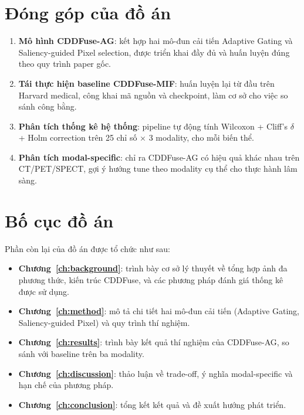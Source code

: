 \section{Đóng góp của đồ án}
\label{sec:contributions}

\begin{enumerate}\itemsep2pt
    \item \textbf{Mô hình CDDFuse-AG}: kết hợp hai mô-đun cải tiến Adaptive Gating và Saliency-guided Pixel selection, được triển khai đầy đủ và huấn luyện đúng theo quy trình paper gốc.
    \item \textbf{Tái thực hiện baseline CDDFuse-MIF}: huấn luyện lại từ đầu trên Harvard medical, công khai mã nguồn và checkpoint, làm cơ sở cho việc so sánh công bằng.
    \item \textbf{Phân tích thống kê hệ thống}: pipeline tự động tính Wilcoxon + Cliff's $\delta$ + Holm correction trên 25 chỉ số $\times$ 3 modality, cho mỗi biến thể.
    \item \textbf{Phân tích modal-specific}: chỉ ra CDDFuse-AG có hiệu quả khác nhau trên CT/PET/SPECT, gợi ý hướng tune theo modality cụ thể cho thực hành lâm sàng.
\end{enumerate}

\section{Bố cục đồ án}
\label{sec:outline}

Phần còn lại của đồ án được tổ chức như sau:

\begin{itemize}\itemsep1pt
    \item \textbf{Chương~\ref{ch:background}}: trình bày cơ sở lý thuyết về tổng hợp ảnh đa phương thức, kiến trúc CDDFuse, và các phương pháp đánh giá thống kê được sử dụng.
    \item \textbf{Chương~\ref{ch:method}}: mô tả chi tiết hai mô-đun cải tiến (Adaptive Gating, Saliency-guided Pixel) và quy trình thí nghiệm.
    \item \textbf{Chương~\ref{ch:results}}: trình bày kết quả thí nghiệm của CDDFuse-AG, so sánh với baseline trên ba modality.
    \item \textbf{Chương~\ref{ch:discussion}}: thảo luận về trade-off, ý nghĩa modal-specific và hạn chế của phương pháp.
    \item \textbf{Chương~\ref{ch:conclusion}}: tổng kết kết quả và đề xuất hướng phát triển.
\end{itemize}
